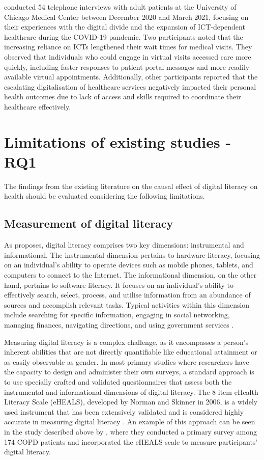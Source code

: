 \textcite{alkureishi_digitally_2021} conducted 54 telephone interviews with adult patients at the University of Chicago Medical Center between December 2020 and March 2021, focusing on their experiences with the digital divide and the expansion of ICT-dependent healthcare during the COVID-19 pandemic. Two participants noted that the increasing reliance on ICTs lengthened their wait times for medical visits. They observed that individuals who could engage in virtual visits accessed care more quickly, including faster responses to patient portal messages and more readily available virtual appointments. Additionally, other participants reported that the escalating digitalisation of healthcare services negatively impacted their personal health outcomes due to lack of access and skills required to coordinate their healthcare effectively.

\section{Limitations of existing studies - RQ1}
The findings from the existing literature on the causal effect of digital literacy on health should be evaluated considering the following limitations.

\subsection{Measurement of digital literacy}
As \textcite[p. 21]{vandijk_deepening_2005} proposes, digital literacy comprises two key dimensions: instrumental and informational. The instrumental dimension pertains to hardware literacy, focusing on an individual's ability to operate devices such as mobile phones, tablets, and computers to connect to the Internet. The informational dimension, on the other hand, pertains to software literacy. It focuses on an individual's ability to effectively search, select, process, and utilise information from an abundance of sources and accomplish relevant tasks. Typical activities within this dimension include searching for specific information, engaging in social networking, managing finances, navigating directions, and using government services \parencite{chetty_bridging_2018}.

Measuring digital literacy is a complex challenge, as it encompasses a person's inherent abilities that are not directly quantifiable like educational attainment or as easily observable as gender. In most primary studies where researchers have the capacity to design and administer their own surveys, a standard approach is to use specially crafted and validated questionnaires that assess both the instrumental and informational dimensions of digital literacy. The 8-item eHealth Literacy Scale (eHEALS), developed by Norman and Skinner in 2006, is a widely used instrument that has been extensively validated and is considered highly accurate in measuring digital literacy \parencite{ariaslopez_digital_2023}. An example of this approach can be seen in the study described above by \textcite{stellefson_association_2019}, where they conducted a primary survey among 174 COPD patients and incorporated the eHEALS scale to measure participants' digital literacy.

